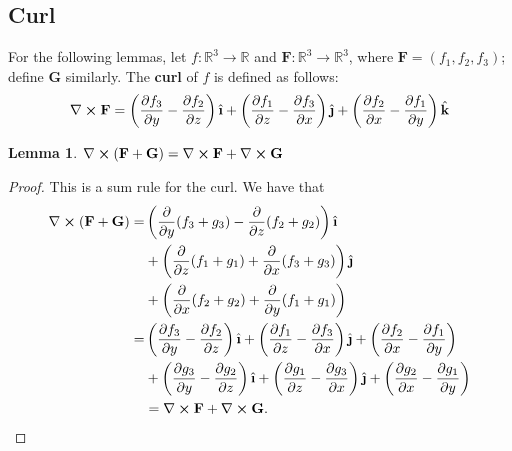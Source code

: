 \documentclass[11pt]{article}
\newtheorem*{lemma*}{Lemma}
\newcommand{\uvec}[1]{\mathop{} \!\hat{\textbf{#1}}}
\renewcommand{\curl}{\nabla \cross}
\begin{document}

\subsection{Curl}


For the following lemmas, let $f : \mathbb{R}^{3} \to \mathbb{R}$ and $\mathbf{F}: \mathbb{R}^{3} \to \mathbb{R}^{3}$, where $\mathbf{F} = (f_{1}, f_{2}, f_{3})$; define $\mathbf{G}$ similarly. The \textbf{curl} of $f$ is defined as follows:
\[
	\curl \mathbf{F} = \left( \pdv{f_{3}}{y} - \pdv{f_{2}}{z} \right) \uvec{\i} + \left( \pdv{f_{1}}{z} - \pdv{f_{3}}{x} \right) \uvec{\j} + \left( \pdv{f_{2}}{x} - \pdv{f_{1}}{y} \right) \uvec{k}
\]


\begin{lemma*}
	$\curl (\mathbf{F} + \mathbf{G}) = \curl \mathbf{F} + \curl \mathbf{G}$ 
\end{lemma*}
\begin{adjustwidth}{0.7cm}{}
    \begin{proof}\renewcommand{\qedsymbol}{}
		This is a sum rule for the curl. We have that
		\begin{align*}
			\curl (\mathbf{F} + \mathbf{G}) =& \left( \pdv{y} (f_{3} + g_{3}) - \pdv{z} (f_{2} + g_{2}) \right) \uvec{\i} \\
			&+ \left( \pdv{z} (f_{1} + g_{1}) + \pdv{x} (f_{3} + g_{3}) \right) \uvec{\j} \\
			&+ \left( \pdv{x} (f_{2} + g_{2}) + \pdv{y} (f_{1} + g_{1}) \right) \\
			=& \left( \pdv{f_{3}}{y} - \pdv{f_{2}}{z} \right) \uvec{\i} + \left( \pdv{f_{1}}{z} - \pdv{f_{3}}{x} \right) \uvec{\j} + \left( \pdv{f_{2}}{x} - \pdv{f_{1}}{y} \right) \\
			&+ \left( \pdv{g_{3}}{y} - \pdv{g_{2}}{z} \right) \uvec{\i} + \left( \pdv{g_{1}}{z} - \pdv{g_{3}}{x} \right) \uvec{\j} + \left( \pdv{g_{2}}{x} - \pdv{g_{1}}{y} \right) \\
			&= \curl \mathbf{F} + \curl \mathbf{G}.
		\end{align*}
	\end{proof} 
\end{adjustwidth}

\end{document}
